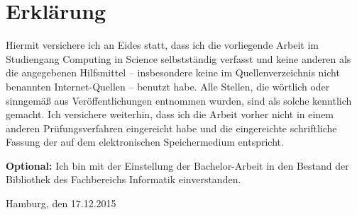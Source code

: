 \documentclass[
	12pt,
	a4paper,
	BCOR10mm,
	DIV14,
	listof=totoc,
	bibliography=totoc,
	headsepline
]{scrreprt}
\begin{document}
\section*{Erklärung}

Hiermit  versichere  ich  an  Eides  statt,  dass  ich  die   vorliegende  Arbeit  im 
Studiengang  Computing  in  Science  selbstständig  verfasst  und  keine  anderen  als 
die  angegebenen  Hilfsmittel – insbesondere  keine  im  Quellenverzeichnis  nicht 
benannten  Internet-Quellen – benutzt  habe.  Alle  Stellen,  die  wörtlich  oder 
sinngemäß aus Veröffentlichungen entnommen wurden, sind als solche kenntlich 
gemacht.  Ich  versichere  weiterhin,  dass  ich  die  Arbeit  vorher  nicht  in  einem 
anderen  Prüfungsverfahren  eingereicht  habe  und  die  eingereichte  schriftliche 
Fassung der auf dem elektronischen 
Speichermedium entspricht.

\smallskip

\textbf{Optional:} Ich bin mit der Einstellung der Bachelor-Arbeit in den Bestand der Bibliothek des Fachbereichs Informatik einverstanden.

\bigskip
\bigskip
\bigskip

Hamburg, den 17.12.2015  \quad \dotfill
\end{document}
